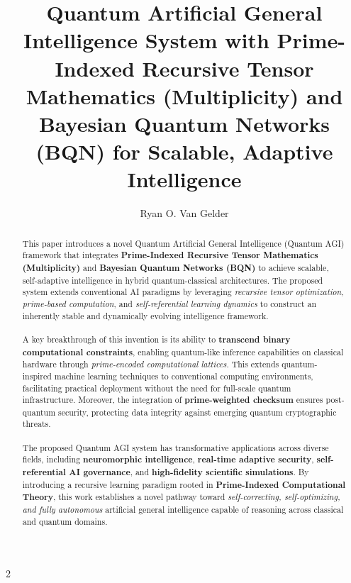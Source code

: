 \documentclass[12pt]{article}
\begin{document}
\title{Quantum Artificial General Intelligence System with Prime-Indexed Recursive Tensor Mathematics (Multiplicity) and Bayesian Quantum Networks (BQN) for Scalable, Adaptive Intelligence}
\author{Ryan O. Van Gelder}
\maketitle
\begin{abstract}
This paper introduces a novel Quantum Artificial General Intelligence (Quantum AGI) framework that integrates \textbf{Prime-Indexed Recursive Tensor Mathematics (Multiplicity)} and \textbf{Bayesian Quantum Networks (BQN)} to achieve scalable, self-adaptive intelligence in hybrid quantum-classical architectures. The proposed system extends conventional AI paradigms by leveraging \textit{recursive tensor optimization}, \textit{prime-based computation}, and \textit{self-referential learning dynamics} to construct an inherently stable and dynamically evolving intelligence framework.

\paragraph{}A key breakthrough of this invention is its ability to \textbf{transcend binary computational constraints}, enabling quantum-like inference capabilities on classical hardware through \textit{prime-encoded computational lattices}. This extends quantum-inspired machine learning techniques to conventional computing environments, facilitating practical deployment without the need for full-scale quantum infrastructure. Moreover, the integration of \textbf{prime-weighted checksum} ensures post-quantum security, protecting data integrity against emerging quantum cryptographic threats.

\paragraph{}The proposed Quantum AGI system has transformative applications across diverse fields, including \textbf{neuromorphic intelligence}, \textbf{real-time adaptive security}, \textbf{self-referential AI governance}, and \textbf{high-fidelity scientific simulations}. By introducing a recursive learning paradigm rooted in \textbf{Prime-Indexed Computational Theory}, this work establishes a novel pathway toward \textit{self-correcting, self-optimizing, and fully autonomous} artificial general intelligence capable of reasoning across classical and quantum domains.
\end{abstract}
\newpage
\nolinenumbers
 \begin{multicols}{2}
\begin{singlespace}
\tableofcontents
\end{singlespace}
\end{multicols}
\end{document}
